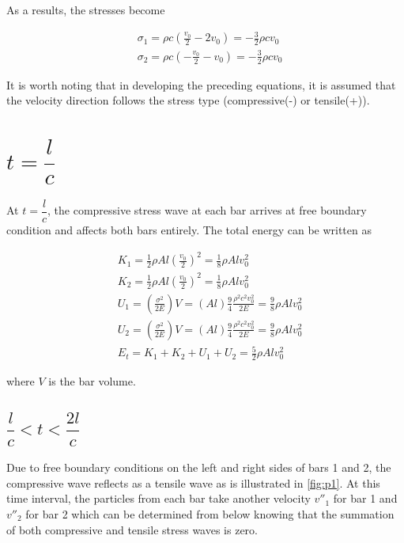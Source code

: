 \documentclass{article}
\begin{document}
As a results, the stresses become

\begin{align*}
    & \sigma_1 = \rho c \left(\frac{v_0}{2} - 2v_0 \right) = -\frac{3}{2} \rho c v_0 \\
    & \sigma_2 = \rho c \left(-\frac{v_0}{2} - v_0 \right) = -\frac{3}{2} \rho c v_0 
\end{align*}

It is worth noting that in developing the preceding equations, it is assumed that the velocity direction follows the stress type (compressive(-) or tensile(+)). \\

\section{$t = \dfrac{l}{c}$}
At $t = \dfrac{l}{c}$, the compressive stress wave at each bar arrives at free boundary condition and affects both bars entirely. The total energy can be written as 

\begin{align*}
    & K_1 = \frac{1}{2} \rho A l (\frac{v_0}{2})^2 =  \frac{1}{8} \rho A l v_0^2 \\
    & K_2 = \frac{1}{2} \rho A l (\frac{v_0}{2})^2 =  \frac{1}{8} \rho A l v_0^2 \\
    & U_1 = \left( \frac{\sigma^2}{2E} \right)V = (A l) \frac{9}{4} \frac{\rho^2 c^2 v_0^2}{2E} = \frac{9}{8} \rho A l v_0^2 \\
    & U_2 = \left( \frac{\sigma^2}{2E} \right)V = (A l) \frac{9}{4} \frac{\rho^2 c^2 v_0^2}{2E} = \frac{9}{8} \rho A l v_0^2 \\
    & E_t = K_1 + K_2 + U_1 + U_2 = \frac{5}{2} \rho A l v_0^2
\end{align*}

where $V$ is the bar volume.

\subsection{$ \dfrac{l}{c} < t < \dfrac{2l}{c}$}
Due to free boundary conditions on the left and right sides of bars 1 and 2, the compressive wave reflects as a tensile wave as is illustrated in \cref{fig:p1}. At this time interval, the particles from each bar take another velocity $v''_1$ for bar 1 and $v''_2$ for bar 2 which can be determined from below knowing that the summation of both compressive and tensile stress waves is zero. \\
\end{document}
